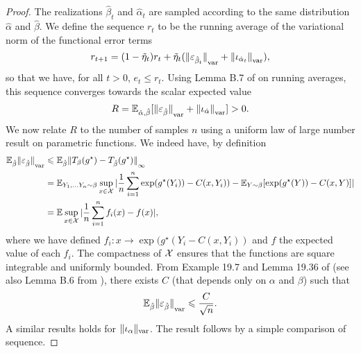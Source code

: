 \begin{proof}
The realizations $\hat \beta_t$ and $\hat \alpha_t$
are sampled according to the same distribution $\hat \alpha$ and $\hat \beta$. We
define the sequence $r_t$ to be the running average of the variational norm of the
functional error terms
\begin{equation}
    r_{t+1} = (1 - \tilde \eta_t) r_t + \tilde \eta_t 
    ({\Vert \varepsilon_{\hat \beta_t} \Vert}_{\text{var}} + 
    {\Vert \iota_{\hat \alpha_t} \Vert}_{\text{var}}),
\end{equation}
so that we have, for all $t > 0$, $e_t \leq r_t$.
Using Lemma B.7 of
\citet{mairal_stochastic_2013} on running averages, this sequence converges towards the scalar expected value
\begin{equation}
    R = \mathbb{E}_{\hat \alpha, \hat \beta}[{\Vert \varepsilon_{\hat \beta} \Vert}_{\text{var}}
    + {\Vert \iota_{\hat \alpha} \Vert}_{\text{var}}] > 0.
\end{equation}
We now relate $R$ to the number of samples $n$ using
a uniform law of large number result on parametric functions. We indeed have, by definition
\begin{align}\label{eq:vdv}
    \mathbb{E}_{\hat \beta} {\Vert \varepsilon_{\hat \beta} \Vert}_{\text{var}} 
    &\leqslant
    \mathbb{E}_{\hat \beta} {\Vert T_{\beta}(g^\star) 
    - T_{\hat \beta}(g^\star) \Vert}_{\infty} \\
    &= \mathbb{E}_{Y_1, \dots Y_n \sim \beta} 
    \sup_{x \in \mathcal{X}}
     | \frac{1}{n} \sum_{i=1}^n \exp(g^\star(Y_i)) - C(x, Y_i))
      - \mathbb{E}_{Y \sim \beta}[\exp(g^\star(Y)) - C(x, Y)] | \\
      &= \mathbb{E} \sup_{x \in \mathcal{X}} | \frac{1}{n} \sum_{i=1}^n f_i(x) - f(x) | ,
\end{align}
where we have defined $f_i: x \to \exp(g^\star(Y_i - C(x, Y_i))$ and $f$ the
expected value of each $f_i$. The compactness of $\mathcal{X}$ ensures that the
functions  are square integrable and uniformly bounded. From Example 19.7 and
Lemma 19.36 of \citet{van_der_vaart_asymptotic_2000} (see also Lemma B.6 from
\citet{mairal_stochastic_2013}), there exists $C$ (that depends only on $\alpha$ and $\beta$) such that
\begin{equation}
    \mathbb{E}_{\hat \beta} {\Vert \varepsilon_{\hat \beta} \Vert}_{\text{var}}  \leqslant \frac{C}{\sqrt{n}}.
\end{equation}
A similar results holds for $\Vert \iota_\alpha \Vert_{\text{var}}$. The result follows by a simple comparison of sequence.
\end{proof}

